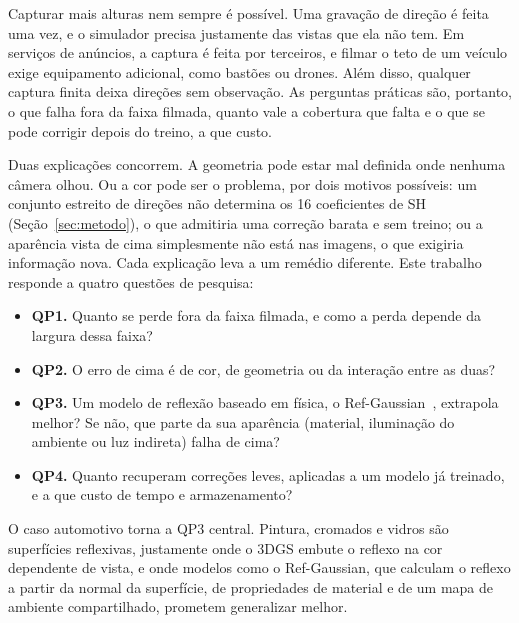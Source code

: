 \documentclass[conference]{IEEEtran}
\begin{document}
Capturar mais alturas nem sempre é possível. Uma gravação de direção é feita uma vez, e o simulador precisa justamente das vistas que ela não tem. Em serviços de anúncios, a captura é feita por terceiros, e filmar o teto de um veículo exige equipamento adicional, como bastões ou drones. Além disso, qualquer captura finita deixa direções sem observação. As perguntas práticas são, portanto, o que falha fora da faixa filmada, quanto vale a cobertura que falta e o que se pode corrigir depois do treino, a que custo.

Duas explicações concorrem. A geometria pode estar mal definida onde nenhuma câmera olhou. Ou a cor pode ser o problema, por dois motivos possíveis: um conjunto estreito de direções não determina os 16 coeficientes de SH (Seção~\ref{sec:metodo}), o que admitiria uma correção barata e sem treino; ou a aparência vista de cima simplesmente não está nas imagens, o que exigiria informação nova. Cada explicação leva a um remédio diferente. Este trabalho responde a quatro questões de pesquisa:
\begin{itemize}
\item \textbf{QP1.} Quanto se perde fora da faixa filmada, e como a perda depende da largura dessa faixa?
\item \textbf{QP2.} O erro de cima é de cor, de geometria ou da interação entre as duas?
\item \textbf{QP3.} Um modelo de reflexão baseado em física, o Ref-Gaussian~\cite{yao2025refgaussian}, extrapola melhor? Se não, que parte da sua aparência (material, iluminação do ambiente ou luz indireta) falha de cima?
\item \textbf{QP4.} Quanto recuperam correções leves, aplicadas a um modelo já treinado, e a que custo de tempo e armazenamento?
\end{itemize}

O caso automotivo torna a QP3 central. Pintura, cromados e vidros são superfícies reflexivas, justamente onde o 3DGS embute o reflexo na cor dependente de vista, e onde modelos como o Ref-Gaussian, que calculam o reflexo a partir da normal da superfície, de propriedades de material e de um mapa de ambiente compartilhado, prometem generalizar melhor.
\end{document}
